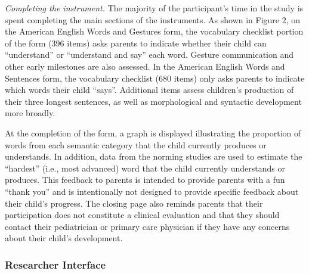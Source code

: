 \documentclass[
  english,
  man]{apa7}
\begin{document}
\emph{Completing the instrument.} The majority of the participant's time in the study is spent completing the main sections of the instruments. As shown in Figure 2, on the American English Words and Gestures form, the vocabulary checklist portion of the form (396 items) asks parents to indicate whether their child can \enquote{understand} or \enquote{understand and say} each word. Gesture communication and other early milestones are also assessed. In the American English Words and Sentences form, the vocabulary checklist (680 items) only asks parents to indicate which words their child \enquote{says}. Additional items assess children's production of their three longest sentences, as well as morphological and syntactic development more broadly.

At the completion of the form, a graph is displayed illustrating the proportion of words from each semantic category that the child currently produces or understands. In addition, data from the norming studies are used to estimate the \enquote{hardest} (i.e., most advanced) word that the child currently understands or produces. This feedback to parents is intended to provide parents with a fun \enquote{thank you} and is intentionally not designed to provide specific feedback about their child's progress. The closing page also reminds parents that their participation does not constitute a clinical evaluation and that they should contact their pediatrician or primary care physician if they have any concerns about their child's development.

\hypertarget{researcher-interface}{%
\subsubsection{Researcher Interface}\label{researcher-interface}}
\end{document}
